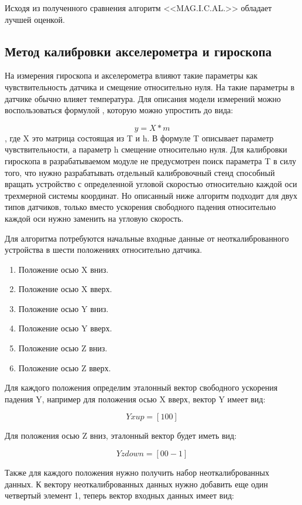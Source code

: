Исходя из полученного сравнения алгоритм <<MAG.I.C.AL.>> обладает лучшей оценкой.

\subsection{Метод калибровки акселерометра и гироскопа}

На измерения гироскопа и акселерометра влияют такие параметры как чувствительность датчика и смещение относительно нуля.
На такие параметры в датчике обычно влияет температура.
Для описания модели измерений можно воспользоваться формулой %
, которую можно упростить до вида:

$$ y = X*m $$
, где X это матрица состоящая из T и h.
В формуле T описывает параметр чувствительности, а параметр h смещение относительно нуля.
Для калибровки гироскопа в разрабатываемом модуле не предусмотрен поиск параметра T в силу того, 
что нужно разрабатывать отдельный калибровочный стенд способный вращать устройство с определенной 
угловой скоростью относительно каждой оси трехмерной системы координат. Но описанный ниже алгоритм подходит для двух типов датчиков, 
только вместо ускорения свободного падения относительно каждой оси нужно заменить на угловую скорость.

Для алгоритма потребуются начальные входные данные от неоткалиброванного устройства в шести положениях относительно датчика.
\begin{enumerate}
    \item Положение осью X вниз.
    \item Положение осью X вверх.
    \item Положение осью Y вниз.
    \item Положение осью Y вверх.
    \item Положение осью Z вниз.
    \item Положение осью Z вверх.
\end{enumerate}

Для каждого положения определим эталонный вектор свободного ускорения падения Y, например для положения осью X вверх, вектор Y имеет вид:

$$ Yxup = [1 0 0] $$

Для положения осью Z вниз, эталонный вектор будет иметь вид:

$$ Yzdown = [0 0 -1] $$

Также для каждого положения нужно получить набор неоткалиброванных данных. 
К вектору неоткалиброванных данных нужно добавить еще один четвертый элемент 1, теперь вектор входных данных имеет вид:

